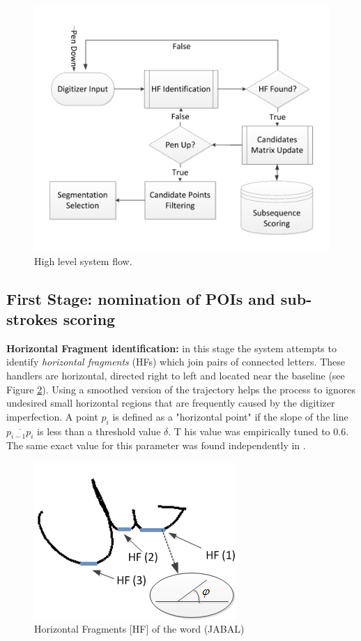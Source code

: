 \documentclass[10pt, conference, compsocconf]{IEEEtran}
\begin{document}
\begin{figure}
\centering
\includegraphics[width=0.9\columnwidth]{./figures/system_flow}
\caption{High level system flow.}
\label{fig:system_flow}
\end{figure}

\subsection{First Stage: nomination of POIs and sub-strokes scoring}

\textbf{Horizontal Fragment identification:} in this stage the system attempts to identify \emph{horizontal fragments} (HFs) which join pairs of connected letters. 
These handlers are horizontal, directed right to left and located near the baseline (see Figure  \ref{fig:horizontal_fragments}). 
Using a smoothed version of the trajectory helps the process to ignores undesired small horizontal regions that are frequently caused by the digitizer imperfection.  
A point $p_{i}$ is defined as a "horizontal point" if the slope of the line $\overline{p_{i-1}p_{i}}$ is less than a threshold value $\delta$. T
his value was empirically tuned to $0.6$. 
The same exact value for this parameter was found independently in \cite{daifallah2009recognition}.\\

\begin{figure}
\centering
\includegraphics[width=0.5\columnwidth]{./figures/horizontal_fragments}
\caption{Horizontal Fragments [HF] of the word (JABAL)}
\label{fig:horizontal_fragments}
\end{figure}
\end{document}
